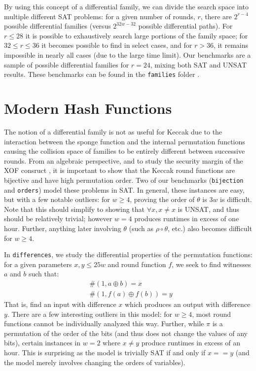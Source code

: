 \documentclass[final]{ieee}
\begin{document}
By using this concept of a differential family, we can divide the search space
into multiple different SAT problems: for a given number of rounds, $r$, there
are $2^{r-4}$ possible differential families (versus $2^{32w-32}$ possible
differential paths). For $r \leq 28$ it is possible to exhaustively search
large portions of the family space; for $32 \leq r \leq 36$ it becomes possible
to find in select cases, and for $r > 36$, it remains impossible in nearly all
cases (due to the large time limit). Our benchmarks are a sample of possible
differential families for $r=24$, mixing both SAT and UNSAT results. These
benchmarks can be found in the \texttt{families} folder \cite{Sat2018}.


\section{Modern Hash Functions}

The notion of a differential family is not as useful for Keccak due to
the interaction between the sponge function and the internal permutation
functions causing the collision space of families to be entirely different
between successive rounds. From an algebraic perspective, and to study the
security margin of the XOF consruct \cite{Keccak3}, it is important to show
that the Keccak round functions are bijective and have high permutation order.
Two of our benchmarks (\texttt{bijection} and \texttt{orders}) model these
problems in SAT. In general, these instances are easy, but with a few notable
outliers: for $w \geq 4$, proving the order of $\theta$ is $3w$ is difficult.
Note that this should simplify to showing that $\forall x, x \neq x$ is UNSAT,
and thus should be relatively trivial; however $w=4$ produces runtimes in
excess of one hour. Further, anything later involving $\theta$ (such as
$\rho \circ \theta$, etc.) also becomes difficult for $w\geq4$.

In \texttt{differences}, we study the differential properties of the
permutation functions: for a given parameters $x, y \leq 25w$ and round
function $f$, we seek to find witnesses $a$ and $b$ such that:
\begin{align*}
    & \#(1, a \oplus b) = x \\
    & \#(1, f(a) \oplus f(b)) = y
\end{align*}
That is, find an input with difference $x$ which produces an output with
difference $y$. There are a few interesting outliers in this model: for
$w\geq4$, most round functions cannot be individually analyzed this way.
Further, while $\pi$ is a permutation of the order of the bits (and thus
does not change the values of any bits), certain instances in $w=2$
where $x \neq y$ produce runtimes in excess of an hour. This is surprising
as the model is trivially SAT if and only if $x == y$ (and the model merely
involves changing the orders of variables).
\end{document}

